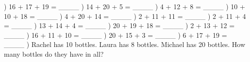 \documentclass{article}%
\begin{document}
\newline%
\newline%
) 16 + 17 + 19 = \_\_\_\_%
\newline%
\newline%
) 14 + 20 + 5 = \_\_\_\_%
\newline%
\newline%
) 4 + 12 + 8 = \_\_\_\_%
\newline%
\newline%
) 10 + 10 + 18 = \_\_\_\_%
\newline%
\newline%
) 4 + 20 + 14 = \_\_\_\_%
\newline%
\newline%
) 2 + 11 + 11 = \_\_\_\_%
\newline%
\newline%
) 2 + 11 + 4 = \_\_\_\_%
\newline%
\newline%
) 13 + 14 + 4 = \_\_\_\_%
\newline%
\newline%
) 20 + 19 + 18 = \_\_\_\_%
\newline%
\newline%
) 2 + 13 + 12 = \_\_\_\_%
\newline%
\newline%
) 16 + 11 + 10 = \_\_\_\_%
\newline%
\newline%
) 20 + 15 + 3 = \_\_\_\_%
\newline%
\newline%
) 6 + 17 + 19 = \_\_\_\_%
\newline%
\newline%
) Rachel has 10 bottles. Laura has 8 bottles. Michael has 20 bottles. How many bottles do they have in all?%
\newline%
\end{document}
